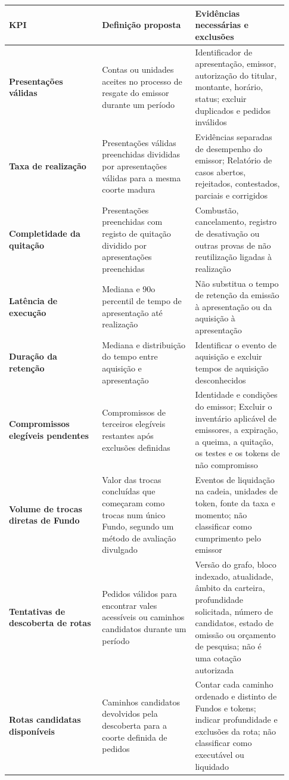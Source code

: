 \documentclass[11pt]{article}
\begin{document}
\begin{longtable}{P{0.31\linewidth} P{0.31\linewidth} P{0.31\linewidth}}
\toprule
KPI & Definição proposta & Evidências necessárias e exclusões \\
\midrule
\endhead
\textbf{Presentações válidas} & Contas ou unidades aceites no processo de resgate do emissor durante um período & Identificador de apresentação, emissor, autorização do titular, montante, horário, status; excluir duplicados e pedidos inválidos \\
\textbf{Taxa de realização} & Presentações válidas preenchidas divididas por apresentações válidas para a mesma coorte madura & Evidências separadas de desempenho do emissor; Relatório de casos abertos, rejeitados, contestados, parciais e corrigidos \\
\textbf{Completidade da quitação} & Presentações preenchidas com registo de quitação dividido por apresentações preenchidas & Combustão, cancelamento, registro de desativação ou outras provas de não reutilização ligadas à realização \\
\textbf{Latência de execução} & Mediana e 90o percentil de tempo de apresentação até realização & Não substitua o tempo de retenção da emissão à apresentação ou da aquisição à apresentação \\
\textbf{Duração da retenção} & Mediana e distribuição do tempo entre aquisição e apresentação & Identificar o evento de aquisição e excluir tempos de aquisição desconhecidos \\
\textbf{Compromissos elegíveis pendentes} & Compromissos de terceiros elegíveis restantes após exclusões definidas & Identidade e condições do emissor; Excluir o inventário aplicável de emissores, a expiração, a queima, a quitação, os testes e os tokens de não compromisso \\
\textbf{Volume de trocas diretas de Fundo} & Valor das trocas concluídas que começaram como trocas num único Fundo, segundo um método de avaliação divulgado & Eventos de liquidação na cadeia, unidades de token, fonte da taxa e momento; não classificar como cumprimento pelo emissor \\
\textbf{Tentativas de descoberta de rotas} & Pedidos válidos para encontrar vales acessíveis ou caminhos candidatos durante um período & Versão do grafo, bloco indexado, atualidade, âmbito da carteira, profundidade solicitada, número de candidatos, estado de omissão ou orçamento de pesquisa; não é uma cotação autorizada \\
\textbf{Rotas candidatas disponíveis} & Caminhos candidatos devolvidos pela descoberta para a coorte definida de pedidos & Contar cada caminho ordenado e distinto de Fundos e tokens; indicar profundidade e exclusões da rota; não classificar como executável ou liquidado \\

\end{longtable}
\end{document}
